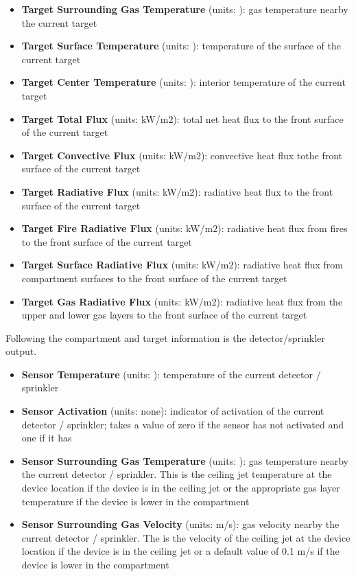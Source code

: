 \begin{itemize}
\item \textbf{Target Surrounding Gas Temperature} (units: \degc): gas temperature nearby the current target
\item \textbf{Target Surface Temperature} (units: \degc): temperature of the surface of the current target
\item \textbf{Target Center Temperature} (units: \degc): interior temperature of the current target
\item \textbf{Target Total Flux} (units: kW/m$2$): total net heat flux to the front surface of the current target
\item \textbf{Target Convective Flux} (units: kW/m$2$): convective heat flux tothe  front surface of the current target
\item \textbf{Target Radiative Flux} (units: kW/m$2$): radiative heat flux to the front surface of the current target
\item \textbf{Target Fire Radiative Flux} (units: kW/m$2$): radiative heat flux from fires to the front surface of the current target
\item \textbf{Target Surface Radiative Flux} (units: kW/m$2$): radiative heat flux from compartment surfaces to the front surface of the current target
\item \textbf{Target Gas Radiative Flux} (units: kW/m$2$):   radiative heat flux from the upper and lower gas layers to the front surface of the current target
\end{itemize}

Following the compartment and target information is the detector/sprinkler output. 

\begin{itemize}
\item \textbf{Sensor Temperature} (units: \degc): temperature of the current detector / sprinkler
\item \textbf{Sensor Activation} (units: none): indicator of activation of the current detector / sprinkler; takes a value of zero if the sensor has not activated and one if it has
\item \textbf{Sensor Surrounding Gas Temperature} (units: \degc): gas temperature nearby the current detector / sprinkler. This is the ceiling jet temperature at the device location if the device is in the ceiling jet or the appropriate gas layer temperature if the device is lower in the compartment
\item \textbf{Sensor Surrounding Gas Velocity} (units: m/s): gas velocity nearby the current detector / sprinkler. The is the velocity of the ceiling jet at the device location if the device is in the ceiling jet or a default value of 0.1 m/s if the device is lower in the compartment
\end{itemize}

